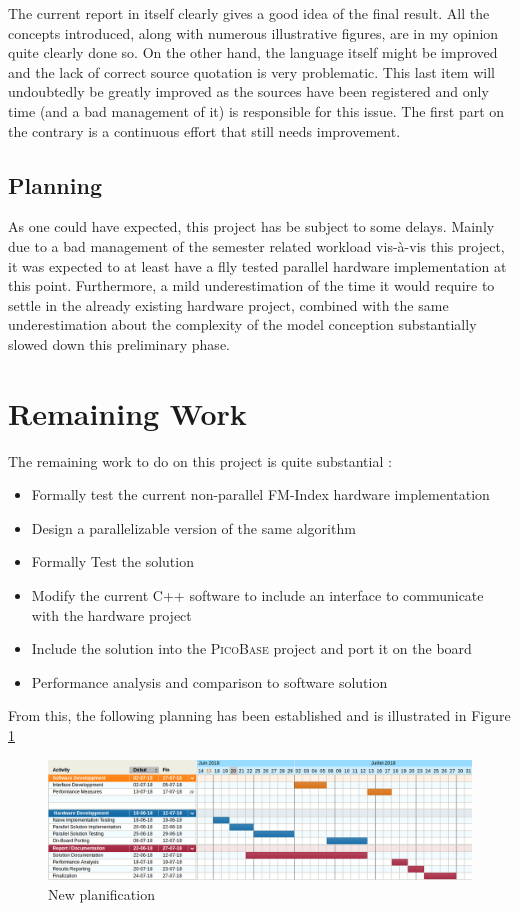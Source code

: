 The current report in itself clearly gives a good idea of the final result. All the concepts introduced, along with  numerous illustrative figures, are in my opinion quite clearly done so. On the other hand, the language itself might be improved and the lack of correct source quotation is very problematic. This last item will undoubtedly be greatly improved as the sources have been registered and only time (and a bad management of it) is responsible for this issue. The first part on the contrary is a continuous effort that still needs improvement. 

\subsection{Planning}

As one could have expected, this project has be subject to some delays. Mainly due to a bad management of the semester related workload vis-à-vis this project, it was expected to at least have a flly tested parallel hardware implementation at this point. Furthermore, a mild underestimation of the time it would require to settle in the already existing hardware project, combined with the same underestimation about the complexity of the model conception substantially slowed down this preliminary phase.

\section{Remaining Work}

The remaining work to do on this project is quite substantial :
\begin{itemize}
    \item Formally test the current non-parallel FM-Index hardware implementation
    \item Design a parallelizable version of the same algorithm
    \item Formally Test the solution
    \item Modify the current \textsc{C++} software to include an interface to communicate with the hardware project
    \item Include the solution into the \textsc{PicoBase} project and port it on the board
    \item Performance analysis and comparison to software solution
\end{itemize}

From this, the following planning has been established and is illustrated in Figure \ref{fig:planif}

\newpage
\begin{figure}[H]
\centering
   \includegraphics[scale = 0.6, angle = 270]{Figures/new_planif.png}
   \caption{New planification}
    \label{fig:planif}
\end{figure}